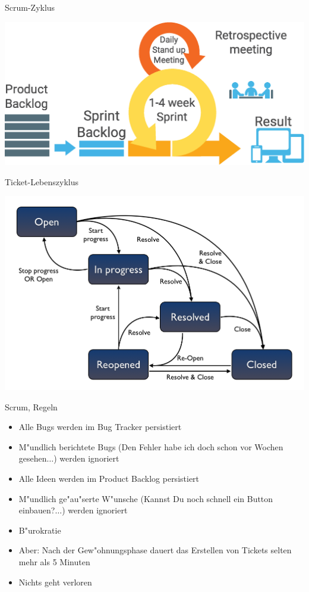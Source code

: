 \documentclass{beamer}
\newcommand{\cmark}{\ding{51}}
\newcommand{\xmark}{\ding{55}}
\begin{document}
\begin{frame}{Scrum-Zyklus}
	\begin{center}
		\includegraphics[scale=.25]{scrum-process.eps}
	\end{center}
\end{frame}

\begin{frame}{Ticket-Lebenszyklus}
	\begin{center}
		\includegraphics[scale=.5]{jira-ticket-lifecycle.png}
	\end{center}
\end{frame}

\begin{frame}{Scrum, Regeln}
	\begin{itemize}
		\item Alle Bugs werden im Bug Tracker persistiert
		\item M"undlich berichtete Bugs (\glqq{}Den Fehler habe ich doch schon vor Wochen gesehen$\ldots$\grqq) werden ignoriert
		\item Alle Ideen werden im Product Backlog persistiert
		\item M"undlich ge"au"serte W"unsche (\glqq{}Kannst Du noch schnell ein Button einbauen?$\ldots$\grqq) werden ignoriert
		\item B"urokratie \xmark
		\item Aber: Nach der Gew"ohnungsphase dauert das Erstellen von Tickets selten mehr als 5 Minuten
		\item Nichts geht verloren \cmark
	\end{itemize}
\end{frame}
\end{document}
